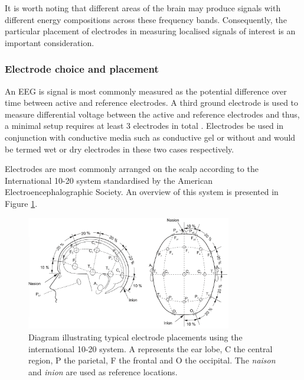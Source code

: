 It is worth noting that different areas of the brain may produce signals with different energy compositions across these frequency bands. Consequently, the particular placement of electrodes in measuring localised signals of interest is an important consideration.

\subsubsection{Electrode choice and placement}
An EEG is signal is most commonly measured as the potential difference over time between active and reference electrodes. A third ground electrode is used to measure differential voltage between the active and reference electrodes and thus, a minimal setup requires at least 3 electrodes in total \cite{bci-survey-nicolas-alonso}. Electrodes be used in conjunction with conductive media such as conductive gel or without and would be termed wet or dry electrodes in these two cases respectively. 

Electrodes are most commonly arranged on the scalp according to the International 10-20 system standardised by the American Electroencephalographic Society. An overview of this system is presented in Figure \ref{fig:10-20-positions}.

\begin{figure}[h]
    \centering
    \includegraphics[width=0.8\textwidth]{10-20-electrode.png}
    \caption[Electrode positions according to the 10-20 system]{Diagram illustrating typical electrode placements using the international 10-20 system. A represents the ear lobe, C the central region, P the parietal, F the frontal and O the occipital. The \textit{naison} and \textit{inion} are used as reference locations.}
    \label{fig:10-20-positions}
\end{figure}

